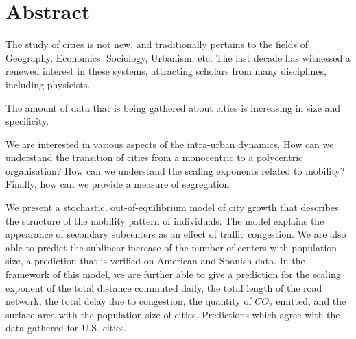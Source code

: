 

\begingroup
\let\clearpage\relax
\let\cleardoublepage\relax
\let\cleardoublepage\relax

\chapter*{Abstract} %


The study of cities is not new, and traditionally pertains to the fields of
Geography, Economics, Sociology, Urbanism, etc.  The last decade has witnessed a
renewed interest in these systems, attracting scholars from many disciplines,
including physicists.

The amount of data that is being gathered about cities is increasing in size and
specificity. 

We are interested in various aspects of the intra-urban dynamics. How can we
understand the transition of cities from a monocentric to a polycentric
organisation? How can we understand the scaling exponents related to mobility?
Finally, how can we provide a measure of segregation

We present a stochastic, out-of-equilibrium model of city growth that describes
the structure of the mobility pattern of individuals. The model explains the
appearance of secondary subcenters as an effect of traffic congestion. We are
also able to predict the sublinear increase of the number of centers with
population size, a prediction that is verified on American and Spanish data. 
In the framework of this model, we are further able to give a prediction for the
scaling exponent of the total distance commuted daily, the total
length of the road network, the total delay due to congestion, the quantity of $CO_2$
emitted, and the surface area with the population size of cities. Predictions
which agree with the data gathered for U.S. cities.



